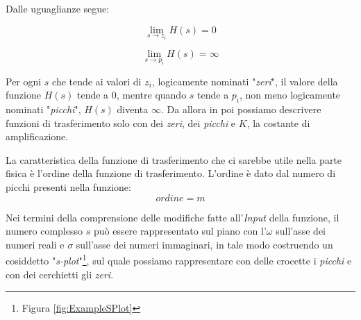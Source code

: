 \documentclass[a4paper, 10pt, final]{article} %
\begin{document}
    \noindent Dalle uguaglianze segue:
    \begin{figure}[H]
        \centering
        \begin{minipage}[b]{.3\linewidth}
            \centering
            \[
                \lim_{s \to z_i} H(s) = 0
            \]
        \end{minipage}
        \hspace{0.04\linewidth}
        \begin{minipage}[b]{.3\linewidth}
            \centering
            \[
                \lim_{s \to p_i} H(s) = \infty
            \]
        \end{minipage}
    \end{figure}
    \noindent Per ogni $s$ che tende ai valori di $z_i$, logicamente nominati "\emph{zeri}", il valore della funzione $H(s)$ tende a $0$, mentre quando $s$ tende a $p_i$, non meno logicamente nominati "\emph{picchi}", $H(s)$ diventa $\infty$.
    Da allora in poi possiamo descrivere funzioni di trasferimento solo con dei \emph{zeri}, dei \emph{picchi} e $K$, la costante di amplificazione.

    La caratteristica della funzione di trasferimento che ci sarebbe utile  nella parte fisica \`{e} l'ordine della funzione di trasferimento.
    L'ordine \`{e} dato dal numero di picchi presenti nella funzione:
    \[
        ordine = m
    \]

    Nei termini della comprensione delle modifiche fatte all'\emph{Input} della funzione, il numero complesso $s$ pu\`{o} essere rappresentato sul piano con l'$\omega$ sull'asse dei numeri reali e $\sigma$ sull'asse dei numeri immaginari, in tale modo costruendo un cosiddetto "\emph{s-plot}"\footnote{Figura \ref{fig:ExampleSPlot}}, sul quale possiamo rappresentare con delle crocette i \emph{picchi} e con dei cerchietti gli \emph{zeri}.
\end{document}
